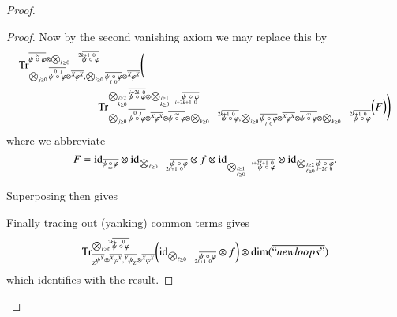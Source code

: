 \documentclass{amsart}
\def\tn{\textnormal}
\def\dim{\tn{dim}}
\def\Trace{\tn{Tr}}
\def\ol{\overline}
\def\id{\tn{id}}
\newcommand{\feeddd}[3]{{\tensor*[^{#2}_{\color{white}{!}}]{{#1}}{^{#3}}}}%
\newcommand{\feeddc}[3]{{\tensor*[^{#2}]{{#1}}{_{#3}}}}
\newcommand{\feedcd}[3]{{\tensor*[_{#2}]{{#1}}{^{#3}}}}
\theoremstyle{remark}
\theoremstyle{definition}
\begin{document}
\begin{proof}
\begin{proof}
Now by the second vanishing axiom we may replace this by
\begin{align*}
&\Trace^{\ol{\psi\;\accentset{\infty}{\circ}\;\varphi}\otimes\bigotimes_{k\ge0}\quad\ol{\psi\;\accentset{2k+1\ 0\ \ \ }{\circ}\;\varphi}}_{\bigotimes_{j\ge0}\ol{\psi\;\accentset{\,0\ j}{\circ}\;\varphi}\otimes\ol{\feeddd{\varphi}{X}{X}},\bigotimes_{i\ge0}\ol{\psi\;\underaccent{\,i\ 0}{\circ}\;\varphi}\otimes\ol{\feeddd{\varphi}{X}{X}}}
\Bigg(\\
&\hspace{1in}\Trace^{\bigotimes_{\substack{\scriptscriptstyle i\ge2\\ \scriptscriptstyle k\ge0}}\ol{\psi\;\accentset{i+2k\ 0}{\circ}\;\varphi}\otimes\bigotimes_{\substack{\scriptscriptstyle i\ge1\\ \scriptscriptstyle k\ge0}}\quad\ol{\psi\;\underaccent{i+2k+1\ 0\ \ \ }{\circ}\;\varphi}}_{\bigotimes_{j\ge0}\ol{\psi\;\accentset{\,0\ j}{\circ}\;\varphi}\otimes\ol{\feeddd{\varphi}{X}{X}}\otimes\ol{\psi\;\accentset{\infty}{\circ}\;\varphi}\otimes\bigotimes_{k\ge0}\quad\ol{\psi\;\accentset{2k+1\ 0\ \ \ }{\circ}\;\varphi},\bigotimes_{i\ge0}\ol{\psi\;\underaccent{\,i\ 0}{\circ}\;\varphi}\otimes\ol{\feeddd{\varphi}{X}{X}}\otimes\ol{\psi\;\accentset{\infty}{\circ}\;\varphi}\otimes\bigotimes_{k\ge0}\quad\ol{\psi\;\accentset{2k+1\ 0\ \ \ }{\circ}\;\varphi}}
\Big(F\Big)\Bigg)
\end{align*}
where we abbreviate
\[F=\id_{\ol{\psi\,\underaccent{\,\infty}{\circ}\,\varphi}}\otimes\id_{\bigotimes_{\ell\ge0}\quad\ol{\psi\;\underaccent{2\ell+1\ 0\ \ \ }{\circ}\;\varphi}}\otimes f\otimes \id_{\bigotimes_{\substack{\scriptscriptstyle i\ge1\\ \scriptscriptstyle \ell\ge0}}\quad\ol{\psi\;\accentset{i+2\ell+1\ 0\ \ \ }{\circ}\;\varphi}}\otimes \id_{\bigotimes_{\substack{\scriptscriptstyle i\ge2\\ \scriptscriptstyle \ell\ge0}}\ol{\psi\;\underaccent{i+2\ell\ 0}{\circ}\;\varphi}}.\]

Superposing then gives
\[\]

Finally tracing out (yanking) common terms gives 
\[\Trace^{\bigotimes_{k\ge0}\ol{\psi\;\accentset{2k+1\ 0\ \ \ \,}{\circ}\;\varphi}}_{\ol{\feedcd{\psi}{Z}{Y}}\otimes\ol{\feeddd{\varphi}{X}{X}},\ol{\feeddc{\psi}{Y}{Z}}\otimes\ol{\feeddd{\varphi}{X}{X}}}
\bigg(
\id_{\bigotimes_{\ell\ge0}\quad\ol{\psi\;\underaccent{2\ell+1\ 0\ \ \ }{\circ}\;\varphi}}\otimes f
\bigg)\otimes\dim(\ol{``newloops"})\]
which identifies with the result.
\end{proof}


\end{proof}
\end{document}

